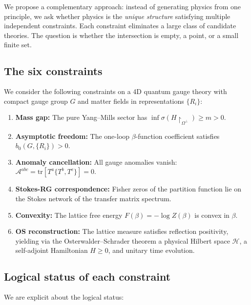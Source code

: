 \documentclass[12pt]{article}
\theoremstyle{definition}
\theoremstyle{remark}
\newcommand{\tr}{\mathrm{tr}}
\begin{document}
We propose a complementary approach: instead of generating physics
from one principle, we ask whether physics is the \emph{unique
structure} satisfying multiple independent constraints.  Each
constraint eliminates a large class of candidate theories.  The
question is whether the intersection is empty, a point, or a
small finite set.

\subsection{The six constraints}

We consider the following constraints on a 4D quantum gauge theory
with compact gauge group $G$ and matter fields in representations
$\{R_i\}$:

\begin{enumerate}[label=\textbf{(C\arabic*)}]
\item \textbf{Mass gap:} The pure Yang--Mills sector has
  $\inf\sigma(H\restriction_{\Omega^\perp}) \geq m > 0$.
\item \textbf{Asymptotic freedom:} The one-loop $\beta$-function
  coefficient satisfies $b_0(G, \{R_i\}) > 0$.
\item \textbf{Anomaly cancellation:} All gauge anomalies vanish:
  $\mathcal{A}^{abc} = \tr[T^a \{T^b, T^c\}] = 0$.
\item \textbf{Stokes-RG correspondence:} Fisher zeros of the
  partition function lie on the Stokes network of the transfer
  matrix spectrum.
\item \textbf{Convexity:} The lattice free energy
  $F(\beta) = -\log Z(\beta)$ is convex in $\beta$.
\item \textbf{OS reconstruction:} The lattice measure satisfies
  reflection positivity, yielding via the Osterwalder--Schrader
  theorem a physical Hilbert space $\mathcal{H}$, a self-adjoint
  Hamiltonian $H \geq 0$, and unitary time evolution.
\end{enumerate}

\subsection{Logical status of each constraint}

We are explicit about the logical status:
\end{document}
